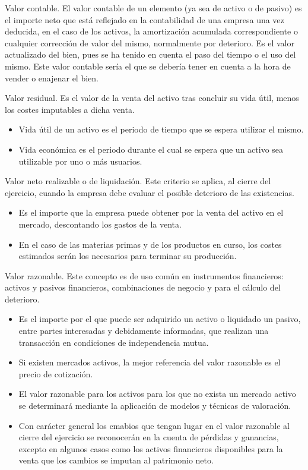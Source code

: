 Valor contable.
El valor contable de un elemento (ya sea de activo o de pasivo) es el importe neto que está reflejado en la contabilidad de una empresa una vez deducida, en el caso de los activos, la amortización acumulada correspondiente o cualquier corrección de valor del mismo, normalmente por deterioro. Es el valor actualizado del bien, pues se ha tenido en cuenta el paso del tiempo o el uso del mismo. Este valor contable sería el que se debería tener en cuenta a la hora de vender o enajenar el bien.

Valor residual.
Es el valor de la venta del activo tras concluir su vida útil, menos los costes imputables a dicha venta.
\begin{itemize}
    \item Vida útil de un activo es el periodo de tiempo que se espera utilizar el mismo.
    \item Vida económica es el periodo durante el cual se espera que un activo sea utilizable por uno o más usuarios.
\end{itemize}

Valor neto realizable o de liquidación.
Este criterio se aplica, al cierre del ejercicio, cuando la empresa debe evaluar el posible deterioro de las existencias.
\begin{itemize}
    \item Es el importe que la empresa puede obtener por la venta del activo en el mercado, descontando los gastos de la venta.
    \item En el caso de las materias primas y de los productos en curso, los costes estimados serán los necesarios para terminar su producción.
\end{itemize}

Valor razonable.
Este concepto es de uso común en instrumentos financieros: activos y pasivos financieros, combinaciones de negocio y para el cálculo del deterioro.
\begin{itemize}
    \item Es el importe por el que puede ser adquirido un activo o liquidado un pasivo, entre partes interesadas y debidamente informadas, que realizan una transacción en condiciones de independencia mutua.
    \item Si existen mercados activos, la mejor referencia del valor razonable es el precio de cotización.
    \item El valor razonable para los activos para los que no exista un mercado activo se determinará mediante la aplicación de modelos y técnicas de valoración.
    \item Con carácter general los cmabios que tengan lugar en el valor razonable al cierre del ejercicio se reconocerán en la cuenta de pérdidas y ganancias, excepto en algunos casos como los activos financieros disponibles para la venta que los cambios se imputan al patrimonio neto.
\end{itemize}

